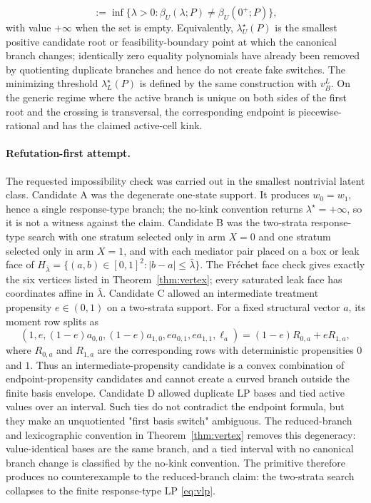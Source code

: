 \begin{theorem}
\[  :=\inf\{\lambda>0:\beta_U(\lambda;P)\ne\beta_U(0^+;P)\},
\]
with value $+\infty$ when the set is empty. Equivalently, $\lambda_U^\star(P)$ is the smallest positive
candidate root or feasibility-boundary point at which the canonical branch changes; identically zero equality
polynomials have already been removed by quotienting duplicate branches and hence do not create fake switches.
The minimizing threshold $\lambda_L^\star(P)$ is defined by the same construction with $v_B^L$. On the generic
regime where the active branch is unique on both sides of the first root and the crossing is transversal, the
corresponding endpoint is piecewise-rational and has the claimed active-cell kink.
\end{theorem}

\paragraph{Refutation-first attempt.}
The requested impossibility check was carried out in the smallest nontrivial latent class. Candidate A was the
degenerate one-state support. It produces $w_0=w_1$, hence a single response-type branch; the no-kink
convention returns $\lambda^\star=+\infty$, so it is not a witness against the claim. Candidate B was the
two-strata response-type search with one stratum selected only in arm $X=0$ and one stratum selected only in
arm $X=1$, and with each mediator pair placed on a box or leak face of
$H_{\bar\lambda}=\{(a,b)\in[0,1]^2:|b-a|\le\bar\lambda\}$. The Fréchet face check gives exactly the six
vertices listed in Theorem~\ref{thm:vertex}; every saturated leak face has coordinates affine in
$\bar\lambda$. Candidate C allowed an intermediate treatment propensity $e\in(0,1)$ on a two-strata support.
For a fixed structural vector $a$, its moment row splits as
\[
  (1,e,(1-e)a_{0,0},(1-e)a_{1,0},ea_{0,1},ea_{1,1},\ell_a)
  = (1-e)R_{0,a}+eR_{1,a},
\]
where $R_{0,a}$ and $R_{1,a}$ are the corresponding rows with deterministic propensities $0$ and $1$. Thus an
intermediate-propensity candidate is a convex combination of endpoint-propensity candidates and cannot create a
curved branch outside the finite basis envelope. Candidate D allowed duplicate LP bases and tied active values
over an interval. Such ties do not contradict the endpoint formula, but they make an unquotiented "first basis
switch" ambiguous. The reduced-branch and lexicographic convention in Theorem~\ref{thm:vertex} removes this
degeneracy: value-identical bases are the same branch, and a tied interval with no canonical branch change is
classified by the no-kink convention. The primitive therefore produces no counterexample to the reduced-branch
claim: the two-strata search collapses to the finite response-type LP \eqref{eq:vlp}.

